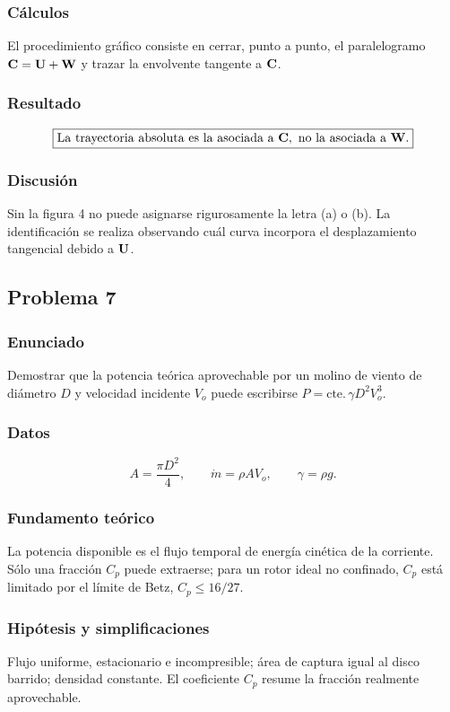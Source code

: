 \documentclass[12pt]{article}
\newcommand{\resultado}[1]{\[
  \boxed{\displaystyle #1}
\]}
\begin{document}
\subsubsection*{Cálculos}
El procedimiento gráfico consiste en cerrar, punto a punto, el paralelogramo
$\vb C=\vb U+\vb W$ y trazar la envolvente tangente a $\vb C$.

\subsubsection*{Resultado}
\resultado{\text{La trayectoria absoluta es la asociada a }\vb C,
\text{ no la asociada a }\vb W.}

\subsubsection*{Discusión}
Sin la figura 4 no puede asignarse rigurosamente la letra (a) o (b). La identificación se
realiza observando cuál curva incorpora el desplazamiento tangencial debido a $\vb U$.

\subsection{Problema 7}

\subsubsection*{Enunciado}
Demostrar que la potencia teórica aprovechable por un molino de viento de diámetro $D$ y
velocidad incidente $V_o$ puede escribirse
$P=\mathrm{cte.}\,\gamma D^2V_o^3$.

\subsubsection*{Datos}
\[
A=\frac{\pi D^2}{4},\qquad \dot m=\rho AV_o,
\qquad \gamma=\rho g.
\]

\subsubsection*{Fundamento teórico}
La potencia disponible es el flujo temporal de energía cinética de la corriente. Sólo una
fracción $C_p$ puede extraerse; para un rotor ideal no confinado, $C_p$ está limitado por el
límite de Betz, $C_p\leq 16/27$.

\subsubsection*{Hipótesis y simplificaciones}
Flujo uniforme, estacionario e incompresible; área de captura igual al disco barrido; densidad
constante. El coeficiente $C_p$ resume la fracción realmente aprovechable.
\end{document}
